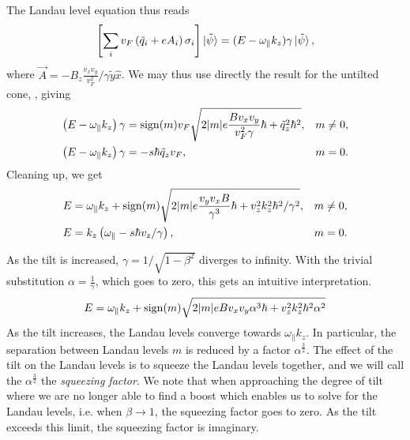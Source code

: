 The Landau level equation thus reads
\begin{equation}
  \label{eq:19}
  \left[
  \sum\limits_{i} v_{F} \left(\tilde{q}_{i} + e A_{i} \right) \sigma _{i}
\right  ] \ket{\tilde{\psi}} =
(E-\omega_{\parallel} k_{z}) \gamma \ket{\tilde{\psi}},
\end{equation}
where \(\vec{A}=-B_{z} \frac{v_{x} v_{y} }{v_{F}^2} / \gamma  \tilde{y} \hat{x}\).
We may thus use directly the result for the untilted cone, , giving
\begin{align}
  \label{eq:20}
  \left(E-\omega _{\parallel} k_{z} \right) \gamma &= \operatorname{sign} (m) v_{F} \sqrt{2 |m| e \frac{B v_{x} v_{y}}{ v_{F} ^2 \gamma } \hbar + \tilde{q}_{z}^2 \hbar ^2}, & m \neq 0,\\
  \left(E-\omega _{\parallel} k_{z} \right) \gamma &= - s \hbar  \tilde{q}_{z} v_{F}, & m=0.
\end{align}
Cleaning up, we get
\begin{align}
  \label{eq:21}
  E &= \omega _{\parallel} k_{z} + \operatorname{sign}(m) \sqrt{2 |m| e \frac{v_{y} v_{x} B}{\gamma ^3} \hbar + v_{z}^2 k_{z}^2\hbar ^2 /\gamma ^2}, & m\neq 0,\\
  E &= k_{z} \left( \omega _{\parallel} - s \hbar v_{z} / \gamma  \right), & m=0.
\end{align}

As the tilt is increased, \(\gamma = 1 / \sqrt{1-\beta ^{2}}\) diverges to infinity.
With the trivial substitution \(\alpha = \frac{1}{\gamma }\), which goes to zero, this gets an intuitive interpretation.
\begin{equation}
  \label{eq:22}
  E = \omega _{\parallel} k_{z} + \operatorname{sign}(m)  \sqrt{2 |m| e B v_{x} v_{y} \alpha  ^3 \hbar + v_{z} ^2 k_{z}^2\hbar ^2 \alpha ^2}
\end{equation}
As the tilt increases, the Landau levels converge towards \(\omega _{\parallel} k_{z}\).
In particular, the separation between Landau levels \(m\)  is reduced by a factor \(\alpha ^{\frac{3}{2}}\).
The effect of the tilt on the Landau levels is to squeeze the Landau levels together, and we will call the \(\alpha ^{\frac{3}{2}}\) the \emph{squeezing factor}.
We note that when approaching the degree of tilt where we are no longer able to find a boost which enables us to solve for the Landau levels, i.e. when \(\beta \to 1\), the squeezing factor goes to zero.
As the tilt exceeds this limit, the squeezing factor is imaginary.

